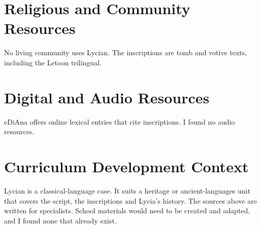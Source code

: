 \documentclass[12pt]{article}
\begin{document}
\section{Religious and Community Resources}
No living community uses Lycian. The inscriptions are tomb and votive texts, including the Letoon trilingual.

\section{Digital and Audio Resources}
eDiAna offers online lexical entries that cite inscriptions. I found no audio resources.

\section{Curriculum Development Context}
Lycian is a classical-language case. It suits a heritage or ancient-languages unit that covers the script, the inscriptions and Lycia's history. The sources above are written for specialists. School materials would need to be created and adapted, and I found none that already exist.
\end{document}
